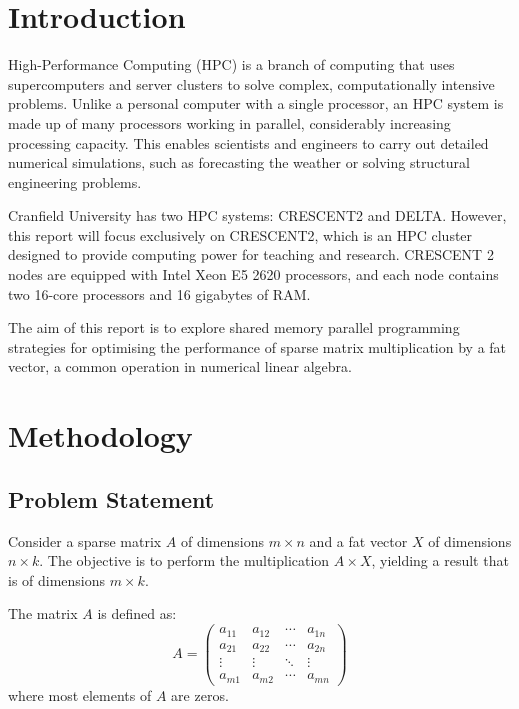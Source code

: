 \documentclass[12pt,oneside]{book} %
\begin{document}
\chapter{Introduction}
High-Performance Computing (HPC) is a branch of computing that uses
supercomputers and server clusters to solve complex, computationally intensive
problems. Unlike a personal computer with a single processor, an HPC system is
made up of many processors working in parallel, considerably increasing
processing capacity. This enables scientists and engineers to carry out
detailed numerical simulations, such as forecasting the weather or solving
structural engineering problems.

Cranfield University has two HPC systems: CRESCENT2 and DELTA. However, this
report will focus exclusively on CRESCENT2, which is an HPC cluster designed to
provide computing power for teaching and research. CRESCENT 2 nodes are
equipped with Intel Xeon E5 2620 processors, and each node contains two 16-core
processors and 16 gigabytes of RAM.

The aim of this report is to explore shared memory parallel programming
strategies for optimising the performance of sparse matrix multiplication by a
fat vector, a common operation in numerical linear algebra.

\chapter{Methodology}

\section{Problem Statement}
Consider a sparse matrix $A$ of dimensions $m \times n$ and a fat vector $X$ of
dimensions $n \times k$. The objective is to perform the multiplication $A
    \times X$, yielding a result that is of dimensions $m \times k$.

The matrix $A$ is defined as:
\begin{equation}
    A = \begin{pmatrix}
        a_{11} & a_{12} & \cdots & a_{1n} \\
        a_{21} & a_{22} & \cdots & a_{2n} \\
        \vdots & \vdots & \ddots & \vdots \\
        a_{m1} & a_{m2} & \cdots & a_{mn}
    \end{pmatrix}
\end{equation}\label{eq:sparse-matrix}
where most elements of $A$ are zeros.
\end{document}
